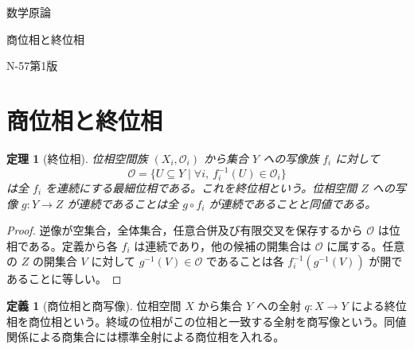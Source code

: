 \documentclass[a5paper,10pt,dvipdfmx]{jsarticle}
\theoremstyle{definition}
\newtheorem{defn}[ruledef]{定義}
\theoremstyle{plain}
\newtheorem{thm}[ruledef]{定理}
\begin{document}
\begin{center}
{\small 数学原論}\par\vspace{4mm}
{\LARGE 商位相と終位相}\par\vspace{2mm}
{\small N-57\quad 第1版}
\end{center}
\section{商位相と終位相}
\begin{thm}[終位相]\label{k258}
位相空間族 $(X_i,\mathcal O_i)$ から集合 $Y$ への写像族 $f_i$ に対して
\[
 \mathcal O=\{U\subseteq Y\mid \forall i,\ f_i^{-1}(U)\in\mathcal O_i\}
\]
は全 $f_i$ を連続にする最細位相である。これを終位相という。位相空間 $Z$ への写像 $g\colon Y\to Z$ が連続であることは全 $g\circ f_i$ が連続であることと同値である。
\end{thm}
\begin{proof}
逆像が空集合，全体集合，任意合併及び有限交叉を保存するから $\mathcal O$ は位相である。定義から各 $f_i$ は連続であり，他の候補の開集合は $\mathcal O$ に属する。任意の $Z$ の開集合 $V$ に対して $g^{-1}(V)\in\mathcal O$ であることは各 $f_i^{-1}(g^{-1}(V))$ が開であることに等しい。
\end{proof}
\begin{defn}[商位相と商写像]\label{k259}
位相空間 $X$ から集合 $Y$ への全射 $q\colon X\to Y$ による終位相を商位相という。終域の位相がこの位相と一致する全射を商写像という。同値関係による商集合には標準全射による商位相を入れる。
\end{defn}
\end{document}
